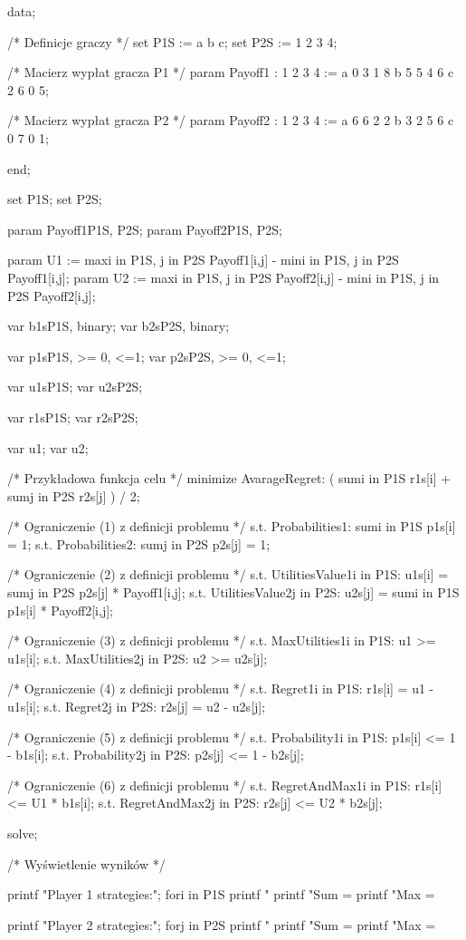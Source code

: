 \documentclass[polish]{standalone}
\begin{document}
\begin{mathprog}[caption=Przykładowe dane]
data;

/* Definicje graczy */
set P1S := a b c;
set P2S := 1 2 3 4;

/* Macierz wypłat gracza P1 */
param Payoff1
    :  1  2  3  4 :=
    a  0  3  1  8
    b  5  5  4  6
    c  2  6  0  5;

/* Macierz wypłat gracza P2 */
param Payoff2
    :  1  2  3  4 :=
    a  6  6  2  2
    b  3  2  5  6
    c  0  7  0  1;
 
end;
\end{mathprog}

\begin{mathprog}[caption=Szukanie rozwiązania]
set P1S;
set P2S;

param Payoff1{P1S, P2S};
param Payoff2{P1S, P2S};

param U1 := max{i in P1S, j in P2S}
  Payoff1[i,j] - min{i in P1S, j in P2S} Payoff1[i,j];
param U2 := max{i in P1S, j in P2S}
  Payoff2[i,j] - min{i in P1S, j in P2S} Payoff2[i,j];

var b1s{P1S}, binary;
var b2s{P2S}, binary;

var p1s{P1S}, >= 0, <=1;
var p2s{P2S}, >= 0, <=1;

var u1s{P1S};
var u2s{P2S};

var r1s{P1S};
var r2s{P2S};

var u1;
var u2;

/* Przykładowa funkcja celu */
minimize AvarageRegret:
  ( sum{i in P1S} r1s[i] + sum{j in P2S} r2s[j] ) / 2;

/* Ograniczenie (1) z definicji problemu */
s.t. Probabilities1:
	sum{i in P1S} p1s[i] = 1;
s.t. Probabilities2:
	sum{j in P2S} p2s[j] = 1;

/* Ograniczenie (2) z definicji problemu */
s.t. UtilitiesValue1{i in P1S}:
	u1s[i] = sum{j in P2S} p2s[j] * Payoff1[i,j];
s.t. UtilitiesValue2{j in P2S}:
	u2s[j] = sum{i in P1S} p1s[i] * Payoff2[i,j];

/* Ograniczenie (3) z definicji problemu */
s.t. MaxUtilities1{i in P1S}:
	u1 >= u1s[i];
s.t. MaxUtilities2{j in P2S}:
	u2 >= u2s[j];

/* Ograniczenie (4) z definicji problemu */
s.t. Regret1{i in P1S}:
	r1s[i] = u1 - u1s[i];
s.t. Regret2{j in P2S}:
	r2s[j] = u2 - u2s[j];

/* Ograniczenie (5) z definicji problemu */
s.t. Probability1{i in P1S}:
	p1s[i] <= 1 - b1s[i];
s.t. Probability2{j in P2S}:
	p2s[j] <= 1 - b2s[j];

/* Ograniczenie (6) z definicji problemu */
s.t. RegretAndMax1{i in P1S}:
	r1s[i] <= U1 * b1s[i];
s.t. RegretAndMax2{j in P2S}:
	r2s[j] <= U2 * b2s[j];

solve;
 
/* Wyświetlenie wyników */ 

printf "Player 1 strategies:\n";
for{i in P1S}
	printf "%
printf "Sum = %
printf "Max = %
 
printf "Player 2 strategies:\n";
for{j in P2S}
	printf "%
printf "Sum = %
printf "Max = %
\end{mathprog}
\end{document}
